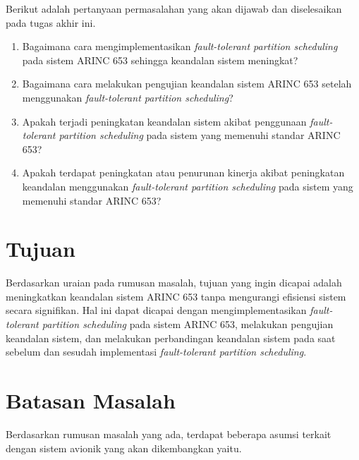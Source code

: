 Berikut adalah pertanyaan permasalahan yang akan dijawab dan diselesaikan pada tugas akhir ini.

\begin{enumerate}

	\item \label{item:problem_fault_tolerant} Bagaimana cara mengimplementasikan \textit{fault-tolerant partition scheduling} pada
    	    sistem ARINC 653 sehingga keandalan sistem meningkat?

    \item Bagaimana cara melakukan pengujian keandalan sistem ARINC 653 setelah menggunakan
    	    \textit{fault-tolerant partition scheduling}?

    \item Apakah terjadi peningkatan keandalan sistem akibat penggunaan \textit{fault-tolerant
    	    partition scheduling} pada sistem yang memenuhi standar ARINC 653?

    \item Apakah terdapat peningkatan atau penurunan kinerja akibat peningkatan keandalan
    	    menggunakan \textit{fault-tolerant partition scheduling} pada sistem yang memenuhi
    	    standar ARINC 653?

\end{enumerate}

\section{Tujuan}
\label{section:tujuan}

Berdasarkan uraian pada rumusan masalah, tujuan yang ingin dicapai adalah meningkatkan keandalan
sistem ARINC 653 tanpa mengurangi efisiensi sistem secara signifikan. Hal ini dapat dicapai
dengan mengimplementasikan \textit{fault-tolerant partition scheduling} pada sistem ARINC 653,
melakukan pengujian keandalan sistem, dan melakukan perbandingan keandalan sistem pada saat
sebelum dan sesudah implementasi \textit{fault-tolerant partition scheduling}.

\section{Batasan Masalah}
\label{section:batasan_masalah}

Berdasarkan rumusan masalah yang ada, terdapat beberapa asumsi terkait dengan sistem avionik
yang akan dikembangkan yaitu.

